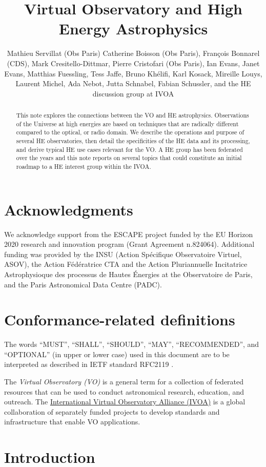 \documentclass[11pt,a4paper]{ivoa}
\title{Virtual Observatory and High Energy Astrophysics}
\author{
Mathieu Servillat (Obs Paris)
Catherine Boisson (Obs Paris),
François Bonnarel (CDS),
Mark Cresitello-Dittmar,
Pierre Cristofari (Obs Paris),
Ian Evans,
Janet Evans,
Matthias Fuessling,
Tess Jaffe,
Bruno Khélifi,
Karl Kosack,
Mireille Louys,
Laurent Michel,
Ada Nebot,
Jutta Schnabel,
Fabian Schussler,
and the HE discussion group at IVOA
}
\begin{document}
\begin{abstract}
This note explores the connections between the \gls{VO} and \gls{HE} astrophysics. Observations of the Universe at high energies are based on techniques that are radically different compared to the optical, or radio domain. We describe the operations and purpose of several HE observatories, then detail the specificities of the \gls{HE} data and its processing, and derive typical \gls{HE} use cases relevant for the \gls{VO}. A \gls{HE} group has been federated over the years and this note reports on several topics that could constitute an initial roadmap to a \gls{HE} interest group within the \gls{IVOA}.
\end{abstract}


\section*{Acknowledgments}

We acknowledge support from the ESCAPE project funded by the EU Horizon 2020 research and innovation program (Grant Agreement n.824064).
Additional funding was provided by the INSU (Action Sp\'ecifique Observatoire Virtuel, ASOV), the Action F\'ed\'eratrice
CTA and the Action Pluriannuelle Incitatrice Astrophysioque des processus de Hautes \'Energies at the Observatoire de
Paris, and the Paris Astronomical Data Centre (PADC).

\section*{Conformance-related definitions}

The words ``MUST'', ``SHALL'', ``SHOULD'', ``MAY'', ``RECOMMENDED'', and
``OPTIONAL'' (in upper or lower case) used in this document are to be
interpreted as described in IETF standard RFC2119 \citep{std:RFC2119}.

The \emph{Virtual Observatory (VO)} is a
general term for a collection of federated resources that can be used
to conduct astronomical research, education, and outreach.
The \href{https://www.ivoa.net}{International Virtual Observatory Alliance (IVOA)} is a global
collaboration of separately funded projects to develop standards and
infrastructure that enable VO applications.


\section{Introduction}
\end{document}
